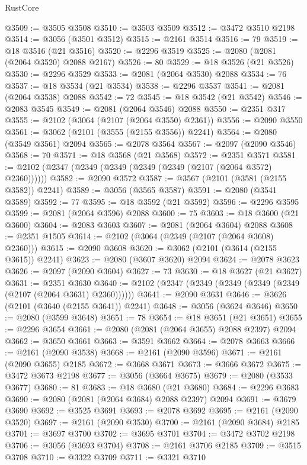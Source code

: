 \begin{lexlean}{RustCore}
\begin{coremodule}
@3509 := @3505 @3508
@3510 := @3503 @3509
@3512 := @3472 @3510 @2198
@3514 := @3056 (@3501 @3512)
@3515 := @2161 @3514
@3516 := 79
@3519 := @18 @3516 (@21 @3516)
@3520 := @2296 @3519
@3525 := @2080 (@2081 (@2064 @3520) @2088 @2167)
@3526 := 80
@3529 := @18 @3526 (@21 @3526)
@3530 := @2296 @3529
@3533 := @2081 (@2064 @3530) @2088
@3534 := 76
@3537 := @18 @3534 (@21 @3534)
@3538 := @2296 @3537
@3541 := @2081 (@2064 @3538) @2088
@3542 := 72
@3545 := @18 @3542 (@21 @3542)
@3546 := @2083 @3545
@3549 := @2081 (@2064 @3546) @2088
@3550 := @2351 @317
@3555 := @2102 (@3064 (@2107 (@2064 @3550) @2361))
@3556 := @2090 @3550
@3561 := @3062 (@2101 (@3555 (@2155 @3556)) @2241)
@3564 := @2080 (@3549 @3561) @2094
@3565 := @2078 @3564
@3567 := @2097 (@2090 @3546)
@3568 := 70
@3571 := @18 @3568 (@21 @3568)
@3572 := @2351 @3571
@3581 := @2102 (@2347 (@2349 (@2349 (@2349 (@2349 (@2107 (@2064 @3572) @2360))))))
@3582 := @2090 @3572
@3587 := @3567 (@2101 (@3581 (@2155 @3582)) @2241)
@3589 := @3056 (@3565 @3587)
@3591 := @2080 (@3541 @3589)
@3592 := 77
@3595 := @18 @3592 (@21 @3592)
@3596 := @2296 @3595
@3599 := @2081 (@2064 @3596) @2088
@3600 := 75
@3603 := @18 @3600 (@21 @3600)
@3604 := @2083 @3603
@3607 := @2081 (@2064 @3604) @2088
@3608 := @2351 @1505
@3614 := @2102 (@3064 (@2349 (@2107 (@2064 @3608) @2360)))
@3615 := @2090 @3608
@3620 := @3062 (@2101 (@3614 (@2155 @3615)) @2241)
@3623 := @2080 (@3607 @3620) @2094
@3624 := @2078 @3623
@3626 := @2097 (@2090 @3604)
@3627 := 73
@3630 := @18 @3627 (@21 @3627)
@3631 := @2351 @3630
@3640 := @2102 (@2347 (@2349 (@2349 (@2349 (@2349 (@2107 (@2064 @3631) @2360))))))
@3641 := @2090 @3631
@3646 := @3626 (@2101 (@3640 (@2155 @3641)) @2241)
@3648 := @3056 (@3624 @3646)
@3650 := @2080 (@3599 @3648)
@3651 := 78
@3654 := @18 @3651 (@21 @3651)
@3655 := @2296 @3654
@3661 := @2080 (@2081 (@2064 @3655) @2088 @2397) @2094
@3662 := @3650 @3661
@3663 := @3591 @3662
@3664 := @2078 @3663
@3666 := @2161 (@2090 @3538)
@3668 := @2161 (@2090 @3596)
@3671 := @2161 (@2090 @3655) @2185
@3672 := @3668 @3671
@3673 := @3666 @3672
@3675 := @3472 @3673 @2198
@3677 := @3056 (@3664 @3675)
@3679 := @2080 (@3533 @3677)
@3680 := 81
@3683 := @18 @3680 (@21 @3680)
@3684 := @2296 @3683
@3690 := @2080 (@2081 (@2064 @3684) @2088 @2397) @2094
@3691 := @3679 @3690
@3692 := @3525 @3691
@3693 := @2078 @3692
@3695 := @2161 (@2090 @3520)
@3697 := @2161 (@2090 @3530)
@3700 := @2161 (@2090 @3684) @2185
@3701 := @3697 @3700
@3702 := @3695 @3701
@3704 := @3472 @3702 @2198
@3706 := @3056 (@3693 @3704)
@3708 := @2161 @3706 @2185
@3709 := @3515 @3708
@3710 := @3322 @3709
@3711 := @3321 @3710

\end{coremodule}
\end{lexlean}

